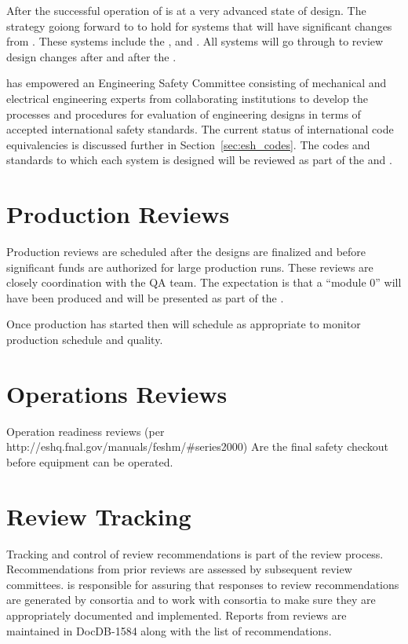 After the successful operation of   is at
a very advanced state of design. The strategy goiong forward to to
hold  for systems that will have significant changes from
. These systems include the ,  and
. All systems will go through  to review
design changes after  and  after the
.

 has empowered an Engineering Safety Committee consisting of
mechanical and electrical engineering experts from collaborating
institutions to develop the processes and procedures for evaluation of
engineering designs in terms of accepted international safety
standards. The current status of international code equivalencies is
discussed further in Section~\ref{sec:esh_codes}. The codes and
standards to which each system is designed will be reviewed as part of
the  and .

\section{Production Reviews}

Production reviews are scheduled after the designs are finalized and
before significant funds are authorized for large production
runs. These reviews are closely coordination with the QA team. The
expectation is that a ``module 0'' will have been produced and will be
presented as part of the .

Once production has started then  will schedule 
as appropriate to monitor production schedule and quality.

\section{Operations Reviews}

Operation readiness reviews (per
http://eshq.fnal.gov/manuals/feshm/\#series2000) Are the final safety
checkout before equipment can be operated.

\section{Review Tracking}

Tracking and control of review recommendations is part of the review
process. Recommendations from prior reviews are assessed by subsequent
review committees.  is responsible for assuring that
responses to review recommendations are generated by consortia and to
work with consortia to make sure they are appropriately documented and
implemented. Reports from  reviews are maintained in
DocDB-1584 along with the list of recommendations.

